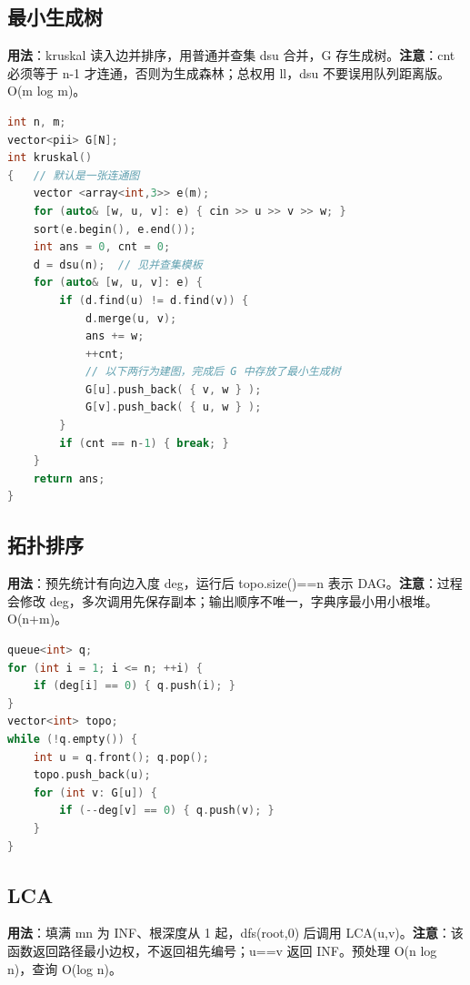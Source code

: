 \documentclass[a4paper,9pt]{extarticle}
\begin{document}
\subsection{最小生成树}

\textbf{用法}：kruskal 读入边并排序，用普通并查集 dsu 合并，G 存生成树。\textbf{注意}：cnt 必须等于 n-1 才连通，否则为生成森林；总权用 ll，dsu 不要误用队列距离版。O(\allowbreak{}m log m)。

\begin{lstlisting}[language={C++}]
int n, m;
vector<pii> G[N];
int kruskal()
{   // 默认是一张连通图
	vector <array<int,3>> e(m);
	for (auto& [w, u, v]: e) { cin >> u >> v >> w; }
	sort(e.begin(), e.end());
	int ans = 0, cnt = 0;
	d = dsu(n);  // 见并查集模板
	for (auto& [w, u, v]: e) {
		if (d.find(u) != d.find(v)) {
			d.merge(u, v);
			ans += w;
			++cnt;
			// 以下两行为建图，完成后 G 中存放了最小生成树
			G[u].push_back( { v, w } );
			G[v].push_back( { u, w } );
		}
		if (cnt == n-1) { break; }
	}
	return ans;
}
\end{lstlisting}

\subsection{拓扑排序}

\textbf{用法}：预先统计有向边入度 deg，运行后 topo.\allowbreak{}size(\allowbreak{})\allowbreak{}=\allowbreak{}=\allowbreak{}n 表示 DAG。\textbf{注意}：过程会修改 deg，多次调用先保存副本；输出顺序不唯一，字典序最小用小根堆。O(\allowbreak{}n+\allowbreak{}m)。

\begin{lstlisting}[language={C++}]
queue<int> q;
for (int i = 1; i <= n; ++i) {
	if (deg[i] == 0) { q.push(i); }
}
vector<int> topo;
while (!q.empty()) {
	int u = q.front(); q.pop();
	topo.push_back(u);
	for (int v: G[u]) {
		if (--deg[v] == 0) { q.push(v); }
	}
}
\end{lstlisting}

\subsection{LCA}

\textbf{用法}：填满 mn 为 INF、根深度从 1 起，dfs(\allowbreak{}root,\allowbreak{}0) 后调用 LCA(u,v)。\textbf{注意}：该函数返回路径最小边权，不返回祖先编号；u=\allowbreak{}=\allowbreak{}v 返回 INF。预处理 O(n log n)，查询 O(log n)。
\end{document}
